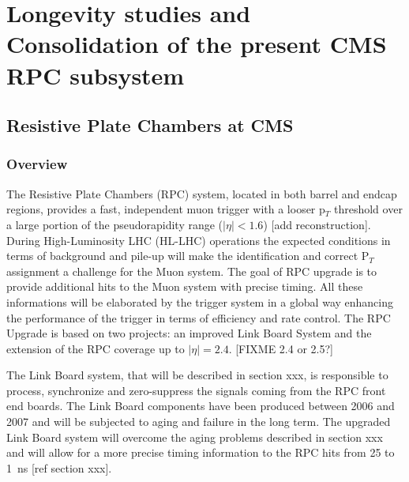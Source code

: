 \renewcommand\evenpagerightmark{{\scshape\small Chapter 4}}
\renewcommand\oddpageleftmark{{\scshape\small Longevity studies and Consolidation of the present \acs{CMS} \acs{RPC} subsystem}}

\renewcommand{\bibname}{References}

\hyphenation{}

\chapter[Longevity studies and Consolidation of the present \acs{CMS} \acs{RPC} subsystem]%
{Longevity studies and Consolidation of the present \acs{CMS} \acs{RPC} subsystem}
\label{chapt4}

\section{Resistive Plate Chambers at CMS}
\label{chapt4:sec:CMS-RPC}

    \subsection{Overview}
    \label{chapt4:ssec:Overview}
    
	The Resistive Plate Chambers (RPC) system, located in both barrel and endcap regions, provides a fast, independent muon trigger with a looser p$_T$ threshold over a large portion of the pseudorapidity range ($|\eta|<1.6$) {\color{blue} [add reconstruction]}.\\
	
	During High-Luminosity LHC (HL-LHC) operations the expected conditions in terms of background and pile-up will make the identification and correct P$_T$ assignment a challenge for the Muon system. The goal of RPC upgrade is to provide additional hits to the Muon system with precise timing. All these informations  will be elaborated by the trigger system  in a global way enhancing the performance of the trigger in terms of efficiency and rate control. The RPC Upgrade is based on two projects: an improved Link Board System and the extension of the RPC coverage up to $|\eta|=2.4$. {\color{blue} [FIXME 2.4 or 2.5?]}

	The Link Board system, that will be described in section xxx, is responsible to process, synchronize and zero-suppress the signals coming from the RPC front end boards. The Link Board components have been produced between 2006 and 2007 and will be subjected to aging and failure in the long term. The upgraded Link Board system will overcome the aging problems described in section xxx and will allow for a more precise timing information to the RPC hits from 25 to \SI{1}{ns} [ref section xxx].

